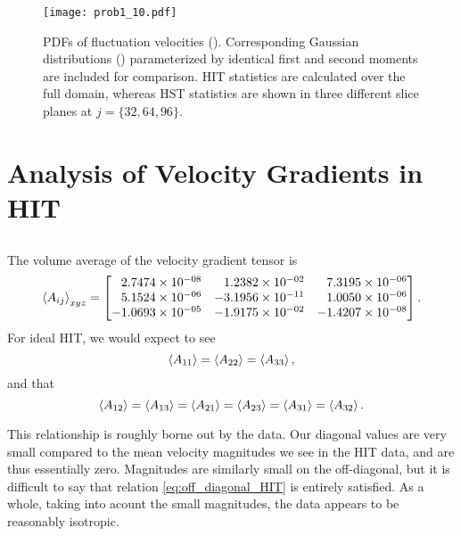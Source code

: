 \documentclass[11pt]{article}
\begin{document}
\begin{figure}[t]
\centering
\texttt{[image: prob1\_10.pdf]}
\\[6pt]
\caption{PDFs of fluctuation velocities (). Corresponding Gaussian distributions () parameterized by identical first and second moments are included for comparison. HIT statistics are calculated over the full domain, whereas HST statistics are shown in three different slice planes at $j = \{32,64,96\}$.}
\label{fig:prob_1_10_fluctuation_pdfs}
\end{figure}

\section{Analysis of Velocity Gradients in HIT}

\subsection{}

The volume average of the velocity gradient tensor is
\[
\expectation{A_{ij}}_{xyz} =
\begin{bmatrix*}[r]
 2.7474\e{-08} &  1.2382\e{-02} &  7.3195\e{-06} \\
 5.1524\e{-06} & -3.1956\e{-11} &  1.0050\e{-06} \\
-1.0693\e{-05} & -1.9175\e{-02} & -1.4207\e{-08}
\end{bmatrix*}
.
\]
For ideal HIT, we would expect to see
\begin{equation}
\left< A_{11} \right> = \left< A_{22} \right> = \left< A_{33} \right>,
\end{equation}
and that
\begin{equation}
\left< A_{12} \right> = \left< A_{13} \right> = \left< A_{21} \right> = \left< A_{23} \right> = \left< A_{31} \right> = \left< A_{32} \right>
.
\label{eq:off_diagonal_HIT}
\end{equation}

This relationship is roughly borne out by the data. Our diagonal values are very small compared to the mean velocity magnitudes we see in the HIT data, and are thus essentially zero. Magnitudes are similarly small on the off-diagonal, but it is difficult to say that relation \eqref{eq:off_diagonal_HIT} is entirely satisfied. As a whole, taking into acount the small magnitudes, the data appears to be reasonably isotropic.

\subsection{}
\end{document}
